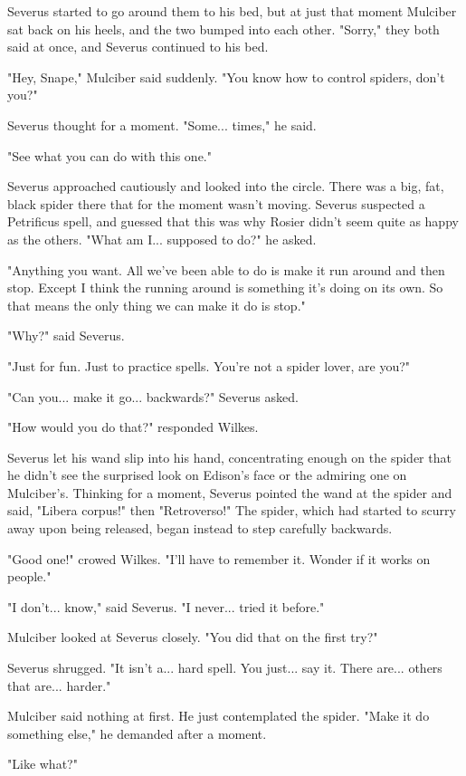 \documentclass[a4paper,11pt]{article}
\begin{document}
Severus started to go around them to his bed, but at just that moment Mulciber sat back on his heels, and the two bumped into each other. "Sorry," they both said at once, and Severus continued to his bed.

"Hey, Snape," Mulciber said suddenly. "You know how to control spiders, don't you?"

Severus thought for a moment. "Some... times," he said.

"See what you can do with this one."

Severus approached cautiously and looked into the circle. There was a big, fat, black spider there that for the moment wasn't moving. Severus suspected a Petrificus spell, and guessed that this was why Rosier didn't seem quite as happy as the others. "What am I... supposed to do?" he asked.

"Anything you want. All we've been able to do is make it run around and then stop. Except I think the running around is something it's doing on its own. So that means the only thing we can make it do is stop."

"Why?" said Severus.

"Just for fun. Just to practice spells. You're not a spider lover, are you?"

"Can you... make it go... backwards?" Severus asked.

"How would you do that?" responded Wilkes.

Severus let his wand slip into his hand, concentrating enough on the spider that he didn't see the surprised look on Edison's face or the admiring one on Mulciber's. Thinking for a moment, Severus pointed the wand at the spider and said, "Libera corpus!" then "Retroverso!" The spider, which had started to scurry away upon being released, began instead to step carefully backwards.

"Good one!" crowed Wilkes. "I'll have to remember it. Wonder if it works on people."

"I don't... know," said Severus. "I never... tried it before."

Mulciber looked at Severus closely. "You did that on the first try?"

Severus shrugged. "It isn't a... hard spell. You just... say it. There are... others that are... harder."

Mulciber said nothing at first. He just contemplated the spider. "Make it do something else," he demanded after a moment.

"Like what?"
\end{document}
